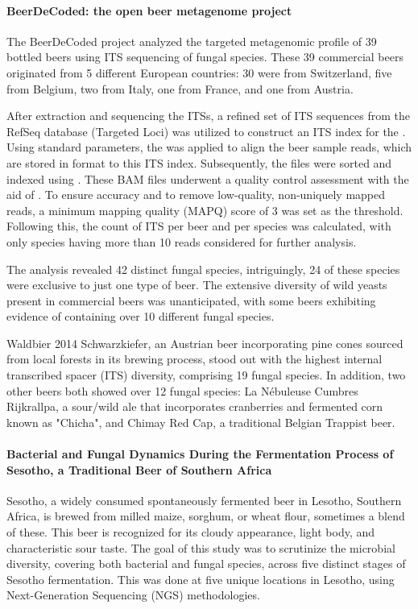             \paragraph*{BeerDeCoded: the open beer metagenome project}
                The BeerDeCoded project analyzed the targeted metagenomic profile of 39 bottled beers using ITS sequencing of fungal species. These 39 commercial beers originated from 5 different European countries: 30 were from Switzerland, five from Belgium, two from Italy, one from France, and one from Austria.

                After extraction and sequencing the ITSs, a refined set of ITS sequences from the RefSeq database\cite{o2016reference} (Targeted Loci) was utilized to construct an ITS index for the  \cite{li2009fast}. Using standard parameters, the  was applied to align the beer sample reads, which are stored in  format to this ITS index. Subsequently, the files were sorted and indexed using  \cite{danecek2021twelve}. These BAM files underwent a quality control assessment with the aid of \cite{lassmann2011samstat}. To ensure accuracy and to remove low-quality, non-uniquely mapped reads, a minimum mapping quality (MAPQ) score of 3 was set as the threshold. Following this, the count of ITS per beer and per species was calculated, with only species having more than 10 reads considered for further analysis.
                
                The analysis revealed 42 distinct fungal species, intriguingly, 24 of these species were exclusive to just one type of beer. The extensive diversity of wild yeasts present in commercial beers was unanticipated, with some beers exhibiting evidence of containing over 10 different fungal species.
                
                Waldbier 2014 Schwarzkiefer, an Austrian beer incorporating pine cones sourced from local forests in its brewing process, stood out with the highest internal transcribed spacer (ITS) diversity, comprising 19 fungal species. In addition, two other beers both showed over 12 fungal species: La Nébuleuse Cumbres Rijkrallpa, a sour/wild ale that incorporates cranberries and fermented corn known as "Chicha", and Chimay Red Cap, a traditional Belgian Trappist beer.
                
            \paragraph*{Bacterial and Fungal Dynamics During the Fermentation Process of Sesotho, a Traditional Beer of Southern Africa}
                Sesotho, a widely consumed spontaneously fermented beer in Lesotho, Southern Africa, is brewed from milled maize, sorghum, or wheat flour, sometimes a blend of these. This beer is recognized for its cloudy appearance, light body, and characteristic sour taste. The goal of this study was to scrutinize the microbial diversity, covering both bacterial and fungal species, across five distinct stages of Sesotho fermentation. This was done at five unique locations in Lesotho, using Next-Generation Sequencing (NGS) methodologies.
                

